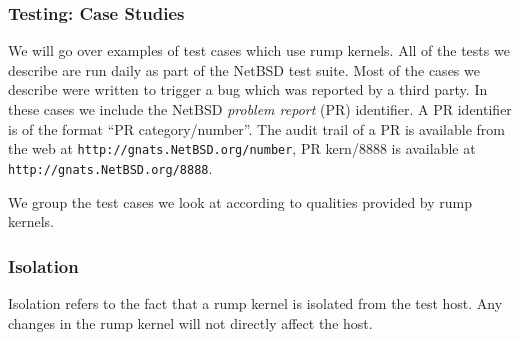 \subsubsection{Testing: Case Studies}
\label{sect:testingstudies}

We will go over examples of test cases which use rump kernels.
All of the tests we describe are run daily as part of the NetBSD
test suite.  Most of the cases we describe were written to trigger
a bug which was reported by a third party.  In these cases we
include the NetBSD \textit{problem report} (PR) identifier.  A PR
identifier is of the format ``PR category/number''.  The audit trail
of a PR is available from the web at
\texttt{http://gnats.NetBSD.org/number}, \eg PR kern/8888 is
available at \texttt{http://gnats.NetBSD.org/8888}.

We group the test cases we look at according to qualities provided
by rump kernels.

\subsubsection*{Isolation}

Isolation refers to the fact that a rump kernel is isolated from
the test host.  Any changes in the rump kernel will not directly
affect the host.


